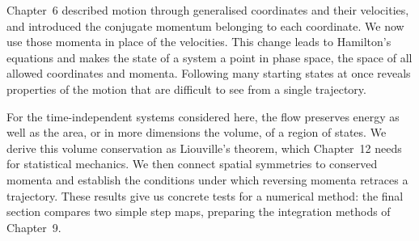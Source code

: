 Chapter~6 described motion through generalised coordinates and their
velocities, and introduced the conjugate momentum belonging to each
coordinate. We now use those momenta in place of the velocities. This
change leads to Hamilton's equations and makes the state of a system a
point in phase space, the space of all allowed coordinates and momenta.
Following many starting states at once reveals properties of the motion
that are difficult to see from a single trajectory.

For the time-independent systems considered here, the flow preserves
energy as well as the area, or in more dimensions the volume, of a region
of states. We derive this volume conservation as Liouville's theorem,
which Chapter~12 needs for statistical mechanics. We then connect spatial
symmetries to conserved momenta and establish the conditions under which
reversing momenta retraces a trajectory. These results give us concrete
tests for a numerical method: the final section compares two simple step
maps, preparing the integration methods of Chapter~9.
